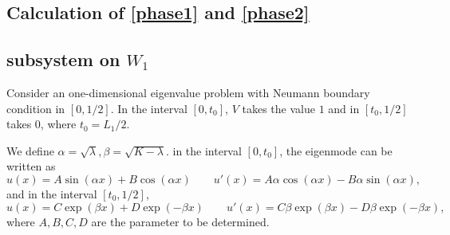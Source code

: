 \documentclass[a4paper,11pt]{article}
\begin{document}
\begin{appendices}
\section{Calculation of \eqref{phase1} and \eqref{phase2}}\label{appC}

\subsection{subsystem on $W_1$}

Consider an one-dimensional eigenvalue problem with Neumann boundary condition in $[0, 1/2]$. In the interval $[0, t_0]$, $V$ takes the value $1$ and in $[t_0, 1/2]$ takes $0$, where $t_0 = L_1/2$.

We define $\alpha = \sqrt{\lambda}, \beta = \sqrt{K - \lambda}$. in the interval $[0, t_0]$, the eigenmode can be written as
\begin{equation*}
u(x) = A \sin(\alpha x) + B \cos(\alpha x) \qquad u'(x) = A \alpha \cos(\alpha x) - B \alpha \sin(\alpha x),
\end{equation*}
and in the interval $[t_0, 1/2]$,
\begin{equation*}
u(x) = C \exp(\beta x) + D \exp(-\beta x) \qquad u'(x) = C \beta \exp(\beta x) - D \beta \exp(-\beta x),
\end{equation*}
where $A ,B, C, D$ are the parameter to be determined.


\end{appendices}
\end{document}
